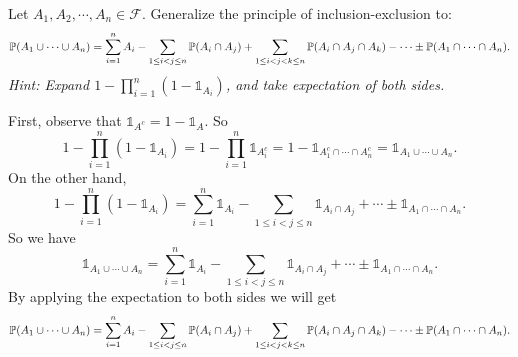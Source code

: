 \begin{problem}
	Let $ A_1,A_2,\cdots,A_n \in \mathcal{F} $. Generalize the principle of inclusion-exclusion to:
	\[ \mathbb{P}(A_1\cup\cdots\cup A_n) = \sum_{i=1}^n A_i - \sum_{1\leq i < j \leq n} \mathbb{P}(A_i \cap A_j) + \sum_{1\leq i < j < k \leq n} \mathbb{P}(A_i \cap A_j \cap A_k) - \cdots \pm \mathbb{P}(A_1\cap \cdots \cap A_n). \]
	\emph{Hint: Expand $ 1 - \prod_{i=1}^n (1-\mathds{1}_{A_i}) $, and take expectation of both sides.}
\end{problem}
\begin{solution}
	First, observe that $ \mathds{1}_{A^c} = 1 - \mathds{1}_A $. So
	\[ 1 - \prod_{i=1}^n(1-\mathds{1}_{A_i}) = 1 - \prod_{i=1}^n \mathds{1}_{A_i^c} = 1 - \mathds{1}_{A_1^c\cap\cdots\cap A_n^c} = \mathds{1}_{A_1\cup\cdots\cup A_n}.  \]
	On the other hand, 
	\[ 1 - \prod_{i=1}^n (1-\mathds{1}_{A_i}) = \sum_{i=1}^{n}\mathds{1}_{A_i}  - \sum_{1 \leq i < j \leq n} \mathds{1}_{A_i \cap A_j} + \cdots \pm \mathds{1}_{A_1\cap\cdots\cap A_n}.  \]
	So we have
	\[ \mathds{1}_{A_1\cup\cdots\cup A_n} = \sum_{i=1}^{n}\mathds{1}_{A_i}  - \sum_{1 \leq i < j \leq n} \mathds{1}_{A_i \cap A_j} + \cdots \pm \mathds{1}_{A_1\cap\cdots\cap A_n}. \]
	By applying the expectation to both sides we will get
	\[ \mathbb{P}(A_1\cup\cdots\cup A_n) = \sum_{i=1}^n A_i - \sum_{1\leq i < j \leq n} \mathbb{P}(A_i \cap A_j) + \sum_{1\leq i < j < k \leq n} \mathbb{P}(A_i \cap A_j \cap A_k) - \cdots \pm \mathbb{P}(A_1\cap \cdots \cap A_n). \]
\end{solution}

